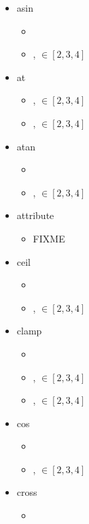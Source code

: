 \documentclass{article}
\begin{document}
\begin{itemize}
\begin{itemize}
\end{itemize}\item asin \begin{itemize}
\item {}
\item {},  $\in [2, 3, 4]$

\end{itemize}\item at \begin{itemize}
\item {},  $\in [2, 3, 4]$
\item {},  $\in [2, 3, 4]$

\end{itemize}\item atan \begin{itemize}
\item {}
\item {},  $\in [2, 3, 4]$

\end{itemize}\item attribute \begin{itemize}
\item FIXME
\end{itemize}\item ceil \begin{itemize}
\item {}
\item {},  $\in [2, 3, 4]$

\end{itemize}\item clamp \begin{itemize}
\item {}
\item {},  $\in [2, 3, 4]$
\item {},  $\in [2, 3, 4]$

\end{itemize}\item cos \begin{itemize}
\item {}
\item {},  $\in [2, 3, 4]$

\end{itemize}\item cross \begin{itemize}
\item {}


\end{itemize}
\end{itemize}
\end{document}
